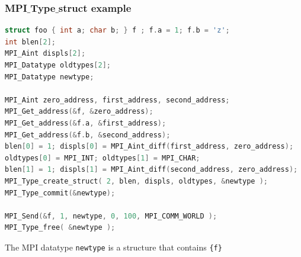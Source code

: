 \begin{frame}[containsverbatim]
\frametitle{MPI$\_$Type$\_$struct example}	

\begin{lstlisting}[language=C,frame=lines,basicstyle=\footnotesize]
struct foo { int a; char b; } f ; f.a = 1; f.b = 'z';
int blen[2];
MPI_Aint displs[2];
MPI_Datatype oldtypes[2];
MPI_Datatype newtype;

MPI_Aint zero_address, first_address, second_address;
MPI_Get_address(&f, &zero_address);
MPI_Get_address(&f.a, &first_address);
MPI_Get_address(&f.b, &second_address);
blen[0] = 1; displs[0] = MPI_Aint_diff(first_address, zero_address);
oldtypes[0] = MPI_INT; oldtypes[1] = MPI_CHAR;
blen[1] = 1; displs[1] = MPI_Aint_diff(second_address, zero_address);
MPI_Type_create_struct( 2, blen, displs, oldtypes, &newtype );
MPI_Type_commit(&newtype);

MPI_Send(&f, 1, newtype, 0, 100, MPI_COMM_WORLD );
MPI_Type_free( &newtype );
\end{lstlisting}
The MPI datatype \texttt{newtype} is a structure that contains \texttt{\{f\}}








\end{frame}
